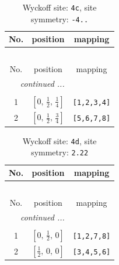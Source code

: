 \documentclass[fleqn,8pt]{jsarticle}
\begin{document}
\renewcommand{\arraystretch}{1.2}
\begin{longtable}{ccc}
\caption{Wyckoff site: {\tt 4c}, site symmetry: {\tt -4..}}
 \\
 \hline \hline
No. & position & mapping \\ \hline \endfirsthead

\multicolumn{2}{l}{\tablename\ \thetable{}} \\
 \hline \hline
No. & position & mapping \\ \hline \endhead

 \hline \hline
\multicolumn{2}{r}{\footnotesize\it continued ...} \\ \endfoot

 \hline \hline
\multicolumn{2}{r}{} \\ \endlastfoot

1 & $\left[ 0,\, \frac{1}{2},\, \frac{1}{4} \right]$ & {\tt [1,2,3,4]} \\ \hline
2 & $\left[ 0,\, \frac{1}{2},\, \frac{3}{4} \right]$ & {\tt [5,6,7,8]} \\
\end{longtable}
\renewcommand{\arraystretch}{1.2}
\begin{longtable}{ccc}
\caption{Wyckoff site: {\tt 4d}, site symmetry: {\tt 2.22}}
 \\
 \hline \hline
No. & position & mapping \\ \hline \endfirsthead

\multicolumn{2}{l}{\tablename\ \thetable{}} \\
 \hline \hline
No. & position & mapping \\ \hline \endhead

 \hline \hline
\multicolumn{2}{r}{\footnotesize\it continued ...} \\ \endfoot

 \hline \hline
\multicolumn{2}{r}{} \\ \endlastfoot

1 & $\left[ 0,\, \frac{1}{2},\, 0 \right]$ & {\tt [1,2,7,8]} \\ \hline
2 & $\left[ \frac{1}{2},\, 0,\, 0 \right]$ & {\tt [3,4,5,6]} \\
\end{longtable}
\renewcommand{\arraystretch}{1.2}
\end{document}
